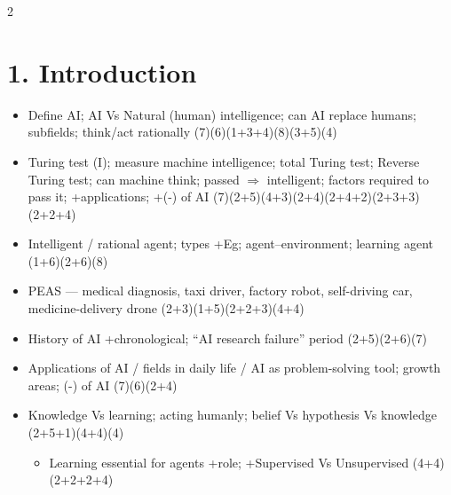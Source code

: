 \documentclass[10pt]{article}
\begin{document}
\begin{multicols}{2}
\footnotesize

\section*{1. Introduction}
\begin{itemize}
  \item Define AI; AI Vs Natural (human) intelligence; can AI replace humans; subfields; think/act rationally \hfill (7)(6)(1+3+4)(8)(3+5)(4)
  \item Turing test (I); measure machine intelligence; total Turing test; Reverse Turing test; can machine think; passed $\Rightarrow$ intelligent; factors required to pass it; +applications; +(-) of AI \hfill (7)(2+5)(4+3)(2+4)(2+4+2)(2+3+3)(2+2+4)
  \item Intelligent / rational agent; types +Eg; agent--environment; learning agent \hfill (1+6)(2+6)(8)
  \item PEAS --- medical diagnosis, taxi driver, factory robot, self-driving car, medicine-delivery drone \hfill (2+3)(1+5)(2+2+3)(4+4)
  \item History of AI +chronological; ``AI research failure'' period \hfill (2+5)(2+6)(7)
  \item Applications of AI / fields in daily life / AI as problem-solving tool; growth areas; (-) of AI \hfill (7)(6)(2+4)
  \item Knowledge Vs learning; acting humanly; belief Vs hypothesis Vs knowledge \hfill (2+5+1)(4+4)(4)
    \begin{itemize}
      \item Learning essential for agents +role; +Supervised Vs Unsupervised \hfill (4+4)(2+2+2+4)
    \end{itemize}
\end{itemize}


\end{multicols}
\end{document}
